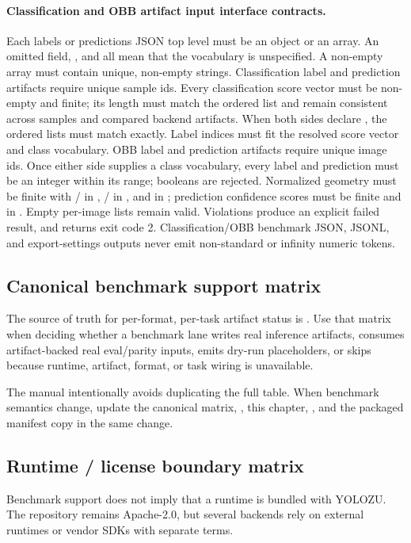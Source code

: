 \paragraph{Classification and OBB artifact input interface contracts.}
Each labels or predictions JSON top level must be an object or an array.
An omitted  field, , and
 all mean that the vocabulary is unspecified. A non-empty
 array must contain unique, non-empty strings.
Classification label and prediction artifacts require unique sample ids.
Every classification score vector must be non-empty and finite; its length must
match the ordered  list and remain consistent across samples and
compared backend artifacts. When both sides declare , the ordered
lists must match exactly. Label indices must fit the resolved score vector and
class vocabulary. OBB label and prediction artifacts require unique image ids.
Once either side supplies a class vocabulary, every label and prediction
 must be an integer within its range; booleans are rejected.
Normalized geometry must be finite with / in \cmd{[0,1]},
/ in \cmd{(0,1]}, and  in
\cmd{[-180,180]}; prediction confidence scores must be finite and in
\cmd{[0,1]}. Empty per-image  lists remain valid. Violations
produce an explicit failed result, and  returns exit code 2.
Classification/OBB benchmark JSON, JSONL, and export-settings outputs never
emit non-standard  or infinity numeric tokens.

\subsection{Canonical benchmark support matrix}
The source of truth for per-format, per-task artifact status is
. Use that matrix when deciding whether
a benchmark lane writes real inference artifacts, consumes artifact-backed real
eval/parity inputs, emits dry-run placeholders, or skips because runtime,
artifact, format, or task wiring is unavailable.

The manual intentionally avoids duplicating the full table. When benchmark
semantics change, update the canonical matrix, ,
this chapter, , and the packaged manifest copy in the
same change.

\subsection{Runtime / license boundary matrix}
Benchmark support does not imply that a runtime is bundled with YOLOZU. The
repository remains Apache-2.0, but several backends rely on external runtimes
or vendor SDKs with separate terms.

